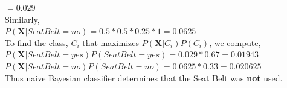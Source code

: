 \documentclass[10pt]{article}
\begin{document}
\hspace{11.5em} $ = 0.029$\\
\vspace{0.5em}
Similarly,\\
\vspace{0.5em}
\hspace{2em} $P(\textbf{X} | Seat Belt = no) = 0.5 * 0.5 * 0.25 * 1 = 0.0625$\\
\vspace{0.5em}
To find the class, $C_{i}$ that maximizes $P(\textbf{X} | C_{i}) P(C_{i})$, we compute,\\
\vspace{0.5em}
\hspace{2em} $P(\textbf{X} | Seat Belt = yes) P( Seat Belt = yes) = 0.029 * 0.67 = 0.01943$\\
\vspace{0.5em}
\hspace{2em} $P(\textbf{X} | Seat Belt = no) P( Seat Belt = no) = 0.0625 * 0.33 = 0.020625$\\
\vspace{0.5em}
Thus naive Bayesian classifier determines that the Seat Belt was \textbf{not} used.
\end{document}
